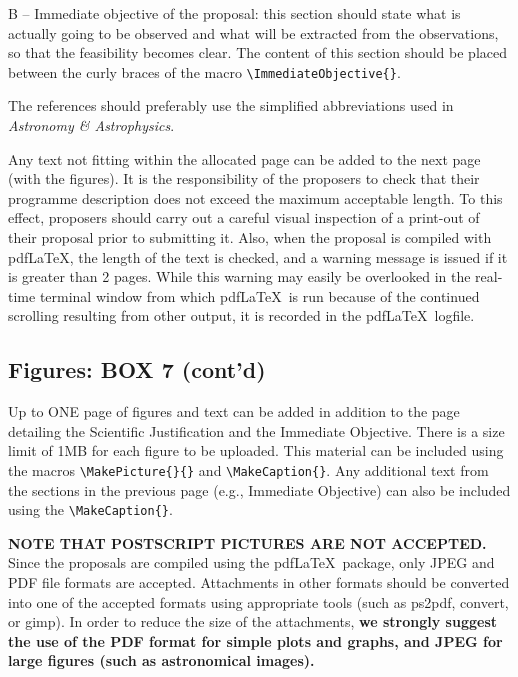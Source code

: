 \documentclass{article}
\begin{document}
B -- Immediate objective of the proposal: this section should state what
is actually going to be observed and what will be extracted from the
observations, so that the feasibility becomes clear.  The content of
this section should be placed between the curly braces of the
macro \verb|\ImmediateObjective{}|.

The references should preferably use the simplified abbreviations used 
in {\em Astronomy \& Astrophysics\/}.

\medskip

 Any text not fitting within the allocated page can be
added to the next page (with the figures). 
It is the responsibility of the proposers to check that their
programme description does not exceed the maximum acceptable
length. To this effect, proposers should carry out a careful visual
inspection of a print-out of their proposal prior to submitting
it. Also, when the proposal is compiled with pdf\LaTeX, the length of
the text is checked, and a warning message is issued if it is greater
than 2 pages. While this warning may easily be overlooked in the
real-time terminal window from which pdf\LaTeX\ is run because of the
continued scrolling resulting from other output, it is recorded in the
pdf\LaTeX\ logfile. 


\subsection{Figures: {\bf BOX 7 (cont'd)}}

Up to ONE page of figures and text can be added in addition to the 
page detailing the Scientific Justification and the Immediate Objective.
There is a size limit of 1MB for each figure to be uploaded.
This material can be included using the 
macros \verb|\MakePicture{}{}| and \verb|\MakeCaption{}|. Any
additional text from the sections in the previous page (e.g.,
Immediate Objective) can also be included using the 
\verb|\MakeCaption{}|.

{\bf NOTE THAT POSTSCRIPT PICTURES ARE NOT ACCEPTED.} Since the
proposals are compiled using the pdf\LaTeX\ package, only JPEG and PDF
file formats are accepted.  Attachments in other formats should be
converted into one of the accepted formats using appropriate tools
(such as ps2pdf, convert, or gimp).  In order to reduce the size of
the attachments, {\bf we strongly suggest the use of the PDF format for
  simple plots and graphs, and JPEG for large figures (such as
  astronomical images).} 
\end{document}
